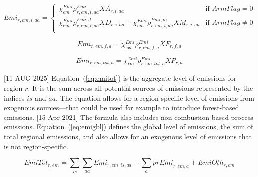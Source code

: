 \documentclass[11pt,letterpaper]{report}
\begin{document}
\begin{equation}
\label{eq:emii}
\mathit{Emi}_{r,\mathit{em},i,\mathit{aa}} = \left\{
\begin{array}{*{20}{l}}
   \displaystyle \chi^{\mathit{Emi}}_{\mathit{em}}
      \rho^{\mathit{Emi}}_{r,\mathit{em},i,\mathit{aa}}
      \mathit{XA}_{r,i,\mathit{aa}}
   & \textrm{if } \mathit{ArmFlag} = 0 \\
   \displaystyle \chi^{\mathit{Emi}}_{\mathit{em}}
      \rho^{\mathit{Emi,d}}_{r,\mathit{em},i,\mathit{aa}}
      \mathit{XD}_{r,i,\mathit{aa}}
   +  \chi^{\mathit{Emi}}_{\mathit{em}}
      \rho^{\mathit{Emi,m}}_{r,\mathit{em},i,\mathit{aa}}
      \mathit{XM}_{r,i,\mathit{aa}}
   & \textrm{if } \mathit{ArmFlag} \ne 0 \\
\end{array}
\right.
\end{equation}

\begin{equation}
\label{eq:emifact}
\mathit{Emi}_{r,\mathit{em},f,\mathit{a}} =
   \chi^{\mathit{Emi}}_{\mathit{em}}
   \rho^{\mathit{Emi}}_{r,\mathit{em},\mathit{f},\mathit{a}}
   \mathit{XF}_{r,f,\mathit{a}}
\end{equation}

\begin{equation}
\label{eq:emixp}
\mathit{Emi}_{r,\mathit{em},\mathit{tot},\mathit{a}} =
   \chi^{\mathit{Emi}}_{\mathit{em}}
   \rho^{\mathit{Emi}}_{r,\mathit{em},\mathit{tot},\mathit{a}}
   \mathit{XP}_{r,\mathit{a}}
\end{equation}

[11-AUG-2025] Equation~(\ref{eq:emitot}) is the aggregate level of emissions for region $r$.
It is the sum across all potential sources of emissions represented by the
indices $\mathit{is}$ and $\mathit{aa}$. The equation allows for a region
specific level of emissions from exogenous sources---that could be used for
example to introduce forest-based emissions.
[15-Apr-2021] The formula also includes non-combustion based process
emissions.
Equation~(\ref{eq:emigbl}) defines
the global level of emissions, the sum of total regional emisssions, and also
allows for an exogenous level of emissions that is not region-specific.

\begin{equation}
\label{eq:emitot}
\mathit{EmiTot}_{r,\mathit{em}} =
   \displaystyle \sum_{\mathit{is}} {\sum_{\mathit{aa}} {
      \mathit{Emi}_{r,\mathit{em},\mathit{is},\mathit{aa}}
   }}
   + \sum_a{\mathit{prEmi}_{r,\mathit{em},a}}
   + \mathit{EmiOth}_{r,\mathit{em}}
\end{equation}
\end{document}
